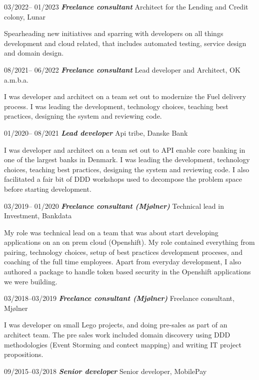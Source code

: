 \documentclass[10pt,a4,sans]{article}
\begin{document}
\begin{CV}
    \item[03/2022-- 01/2023] \textbf{\emph{Freelance consultant}} Architect for the Lending and Credit colony, Lunar

Spearheading new initiatives and sparring with developers on all things development and cloud related, that includes automated testing, service design and domain design.

    \item[08/2021-- 06/2022] \textbf{\emph{Freelance consultant}} Lead developer and Architect, OK a.m.b.a.

I was developer and architect on a team set out to modernize the Fuel delivery process. I was leading the development, technology choices, teaching best practices, designing the system and reviewing code.      

    \item[01/2020-- 08/2021] \textbf{\emph{Lead developer}} Api tribe, Danske Bank

I was developer and architect on a team set out to API enable core banking in one of the largest banks in Denmark. I was leading the development, technology choices, teaching best practices, designing the system and reviewing code. I also facilitated a fair bit of DDD workshops used to decompose the problem space before starting development.

    \item[03/2019-- 01/2020] \textbf{\emph{Freelance consultant (Mjølner)}} Technical lead in Investment, Bankdata
    
My role was technical lead on a team that was about start developing applications on an on prem cloud (Openshift). My role contained everything from pairing, technology choices, setup of best practices development proceses, and coaching of the full time employees. Apart from everyday development, I also authored a package to handle token based security in the Openshift applications we were building.

    \item[03/2018--03/2019] \textbf{\emph{Freelance consultant (Mjølner)}} Freelance consultant, Mjølner
    
I was developer on small Lego projects, and doing pre-sales as part of an architect team. The pre sales work included domain discovery using DDD methodologies (Event Storming and contect mapping) and writing IT project propositions.
 
    \item[09/2015--03/2018] \textbf{\emph{Senior developer}} Senior developer, MobilePay 


\end{CV}
\end{document}
